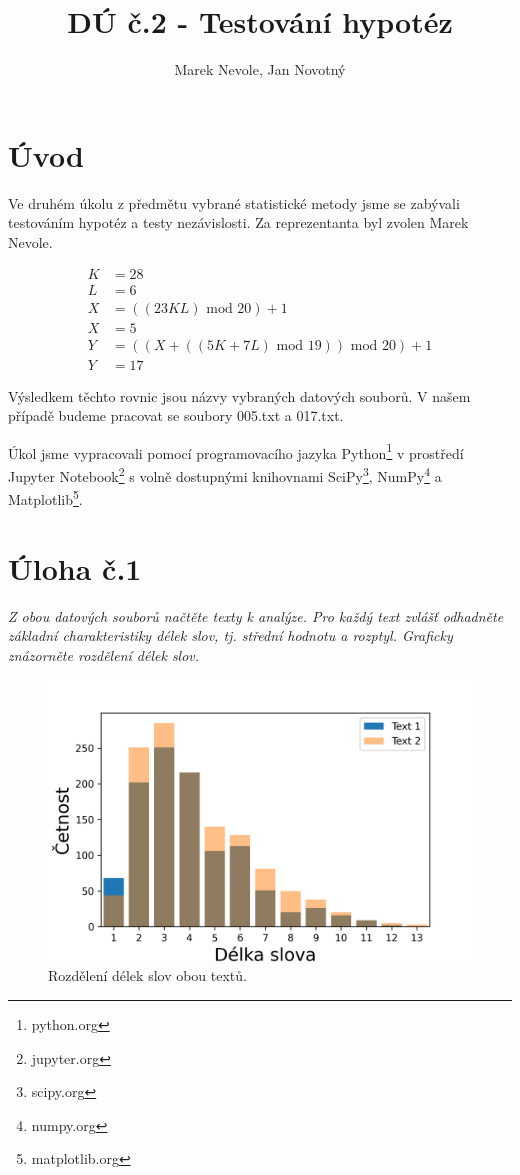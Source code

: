 \documentclass[czech]{mvi-report}
\title{DÚ č.2 - Testování hypotéz}
\author{Marek Nevole, Jan Novotný}
\affiliation{ČVUT - FIT}
\begin{document}
\maketitle

\section{Úvod}
Ve druhém úkolu z předmětu vybrané statistické metody jsme se zabývali testováním hypotéz a testy nezávislosti. Za reprezentanta byl zvolen Marek Nevole.

\begin{align*}
  K &= 28\\
  L &= 6\\
  X &= ((23KL)\text{ mod }20) + 1\\
  X &= 5\\
  Y &= ((X + ((5K + 7L)\text{ mod }19))\text{ mod }20) + 1\\
  Y &= 17
\end{align*}

Výsledkem těchto rovnic jsou názvy vybraných datových souborů. V našem případě budeme pracovat se soubory 005.txt a 017.txt.

Úkol jsme vypracovali pomocí programovacího jazyka Python\footnote{python.org} v prostředí Jupyter Notebook\footnote{jupyter.org} s volně dostupnými knihovnami SciPy\footnote{scipy.org}, NumPy\footnote{numpy.org} a Matplotlib\footnote{matplotlib.org}.

\section{Úloha č.1}
\textit{Z obou datových souborů načtěte texty k analýze. Pro každý text zvlášť odhadněte základní charakteristiky délek slov, tj. střední hodnotu a rozptyl. Graficky znázorněte rozdělení délek slov.}\\



\begin{figure}
\includegraphics[width=1\columnwidth]{img/wdistr.png} 
\caption{Rozdělení délek slov obou textů.}
\label{fig:wdistr}
\end{figure}
\end{document}
